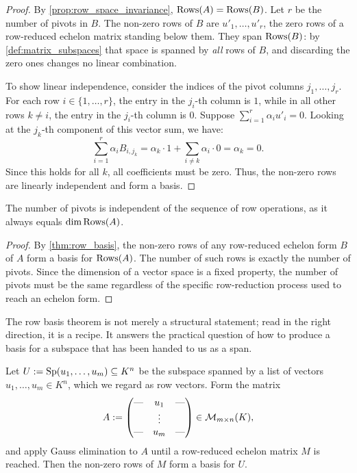 \begin{proof}
By \cref{prop:row_space_invariance}, $\operatorname{Rows}(A) = \operatorname{Rows}(B)$. Let $r$ be the number of pivots in $B$. The non-zero rows of $B$ are $u'_1, \dots, u'_r$, the zero rows of a row-reduced echelon matrix standing below them. They span $\operatorname{Rows}(B)$: by \cref{def:matrix_subspaces} that space is spanned by \emph{all} rows of $B$, and discarding the zero ones changes no linear combination.

To show linear independence, consider the indices of the pivot columns $j_1, \dots, j_r$. For each row $i \in \{1, \dots, r\}$, the entry in the $j_i$-th column is $1$, while in all other rows $k \neq i$, the entry in the $j_i$-th column is $0$. 
Suppose $\sum_{i=1}^r \alpha_i u'_i = 0$. Looking at the $j_k$-th component of this vector sum, we have:
\[ \sum_{i=1}^r \alpha_i B_{i, j_k} = \alpha_k \cdot 1 + \sum_{i \neq k} \alpha_i \cdot 0 = \alpha_k = 0. \]
Since this holds for all $k$, all coefficients must be zero. Thus, the non-zero rows are linearly independent and form a basis.
\end{proof}

\begin{corollary}
\label{cor:rank_invariance}
The number of pivots is independent of the sequence of row operations, as it always equals $\dim \operatorname{Rows}(A)$.
\end{corollary}

\begin{proof}
By \cref{thm:row_basis}, the non-zero rows of any row-reduced echelon form $B$ of $A$ form a basis for $\operatorname{Rows}(A)$. The number of such rows is exactly the number of pivots. Since the dimension of a vector space is a fixed property, the number of pivots must be the same regardless of the specific row-reduction process used to reach an echelon form.
\end{proof}

The row basis theorem is not merely a structural statement; read in the right direction, it is a recipe. It answers the practical question of how to produce a basis for a subspace that has been handed to us as a span.

\begin{corollary}
\label{cor:basis_algorithm}
Let $U := \operatorname{Sp}(u_{1}, \dots, u_{m}) \subseteq K^{n}$ be the subspace spanned by a list of vectors $u_{1}, \dots, u_{m} \in K^{n}$, which we regard as row vectors. Form the matrix
\[
A := \begin{pmatrix} \text{---} & u_{1} & \text{---} \\ & \vdots & \\ \text{---} & u_{m} & \text{---} \end{pmatrix} \in \mathcal{M}_{m \times n}(K),
\]
and apply Gauss elimination to $A$ until a row-reduced echelon matrix $M$ is reached. Then the non-zero rows of $M$ form a basis for $U$.
\end{corollary}


